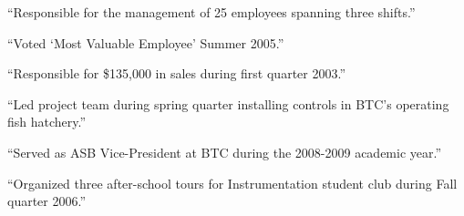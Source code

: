 \vskip 10pt {\narrower \noindent \baselineskip5pt

``Responsible for the management of 25 employees spanning three shifts.''

\vskip 10pt

``Voted `Most Valuable Employee' Summer 2005.''

\vskip 10pt

``Responsible for \$135,000 in sales during first quarter 2003.''

\vskip 10pt

``Led project team during spring quarter installing controls in BTC's operating fish hatchery.''

\vskip 10pt

``Served as ASB Vice-President at BTC during the 2008-2009 academic year.''

\vskip 10pt

``Organized three after-school tours for Instrumentation student club during Fall quarter 2006.''

\par} \vskip 10pt




